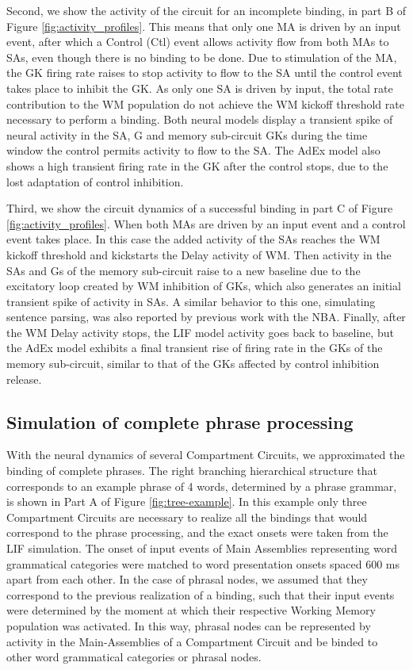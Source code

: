 \documentclass[10pt]{article}
\begin{document}
Second, we show the activity of the circuit for an incomplete binding, in part B of Figure \ref{fig:activity_profiles}.
This means that only one MA is driven by an input event, after which a Control (Ctl) event allows activity flow from both MAs to SAs, even though there is no binding to be done.
Due to stimulation of the MA, the GK firing rate raises to stop activity to flow to the SA until the control event takes place to inhibit the GK.
As only one SA is driven by input, the total rate contribution to the WM population do not achieve the WM kickoff threshold rate necessary to perform a binding.
Both neural models display a transient spike of neural activity in the SA, G and memory sub-circuit GKs during the time window the control permits activity to flow to the SA.
The AdEx model also shows a high transient firing rate in the GK after the control stops, due to the lost adaptation of control inhibition.

Third, we show the circuit dynamics of a successful binding in part C of Figure \ref{fig:activity_profiles}.
When both MAs are driven by an input event and a control event takes place.
In this case the added activity of the SAs reaches the WM kickoff threshold and kickstarts the Delay activity of WM.
Then activity in the SAs and Gs of the memory sub-circuit raise to a new baseline due to the excitatory loop created by WM inhibition of GKs, which also generates an initial transient spike of activity in SAs.
A similar behavior to this one, simulating sentence parsing, was also reported by previous work with the NBA\cite{Frank_2014}.
Finally, after the WM Delay activity stops, the LIF model activity goes back to baseline, but the AdEx model exhibits a final transient rise of firing rate in the GKs of the memory sub-circuit, similar to that of the GKs affected by control inhibition release.


\subsection{Simulation of complete phrase processing}
{\label{44kfmvjkc32}}


With the neural dynamics of several Compartment Circuits, we approximated the binding of complete phrases.
The right branching hierarchical structure that corresponds to an example phrase of 4 words, determined by a phrase grammar, is shown in Part A of Figure \ref{fig:tree-example}.
In this example only three Compartment Circuits are necessary to realize all the bindings that would correspond to the phrase processing, and the exact onsets were taken from the LIF simulation.
The onset of input events of Main Assemblies representing word grammatical categories were matched to word presentation onsets spaced 600 ms apart from each other.
In the case of phrasal nodes, we assumed that they correspond to the previous realization of a binding, such that their input events were determined by the moment at which their respective Working Memory population was activated.
In this way, phrasal nodes can be represented by activity in the Main-Assemblies of a Compartment Circuit and be binded to other word grammatical categories or phrasal nodes.
\end{document}
